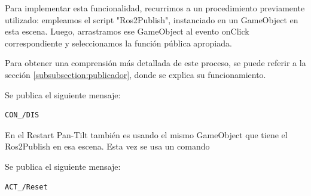Para implementar esta funcionalidad, recurrimos a un procedimiento previamente utilizado: empleamos el script "Ros2Publish", instanciado en un GameObject en esta escena. Luego, arrastramos ese GameObject al evento onClick correspondiente y seleccionamos la función pública apropiada.

Para obtener una comprensión más detallada de este proceso, se puede referir a la sección \ref{subsubsection:publicador}, donde se explica su funcionamiento.

Se publica el siguiente mensaje:
\begin{verbatim}
CON_/DIS
\end{verbatim}



En el Restart Pan-Tilt también es usando el mismo GameObject que tiene el Ros2Publish en esa escena. Esta vez se usa un comando 

Se publica el siguiente mensaje:
\begin{verbatim}
ACT_/Reset
\end{verbatim}









